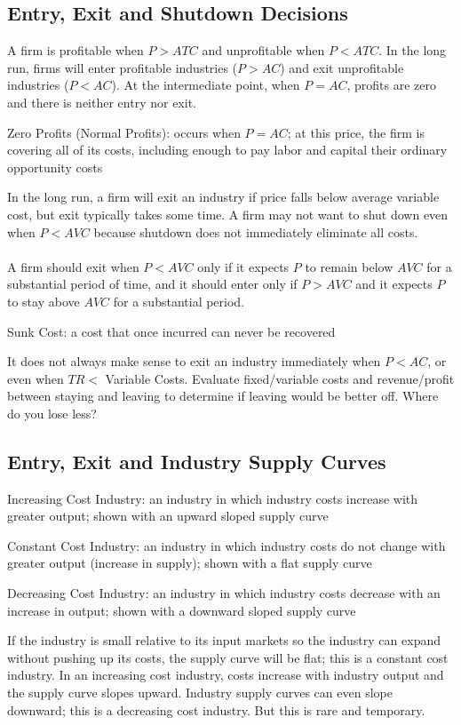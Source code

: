 \documentclass[12pt]{article}
\begin{document}
\subsection{Entry, Exit and Shutdown Decisions}
A firm is profitable when $P > ATC$ and unprofitable when $P < ATC$. In the long run, firms will enter profitable industries ($P > AC$) and exit unprofitable industries ($P < AC$). At the intermediate point, when $P = AC$, profits are zero and there is neither entry nor exit. 
\begin{definition} Zero Profits (Normal Profits): occurs when $P = AC$; at this price, the firm is covering all of its costs, including enough to pay labor and capital their ordinary opportunity costs \end{definition}
In the long run, a firm will exit an industry if price falls below average variable cost, but exit typically takes some time. A firm may not want to shut down even when $P < AVC$ because shutdown does not immediately eliminate all costs. \\~\\
A firm should exit when $P < AVC$ only if it expects $P$ to remain below $AVC$ for a substantial period of time, and it should enter only if $P > AVC$ and it expects $P$ to stay above $AVC$ for a substantial period. 
\begin{definition} Sunk Cost: a cost that once incurred can never be recovered \end{definition}
It does not always make sense to exit an industry immediately when $P < AC$, or even when $TR < $ Variable Costs. Evaluate fixed/variable costs and revenue/profit between staying and leaving to determine if leaving would be better off. Where do you lose less? 

\subsection{Entry, Exit and Industry Supply Curves}
\begin{definition} Increasing Cost Industry: an industry in which industry costs increase with greater output; shown with an upward sloped supply curve \end{definition}
\begin{definition} Constant Cost Industry: an industry in which industry costs do not change with greater output (increase in supply); shown with a flat supply curve \end{definition}
\begin{definition} Decreasing Cost Industry: an industry in which industry costs decrease with an increase in output; shown with a downward sloped supply curve \end{definition}
If the industry is small relative to its input markets so the industry can expand without pushing up its costs, the supply curve will be flat; this is a constant cost industry. In an increasing cost industry, costs increase with industry output and the supply curve slopes upward. Industry supply curves can even slope downward; this is a decreasing cost industry. But this is rare and temporary. 
\end{document}
